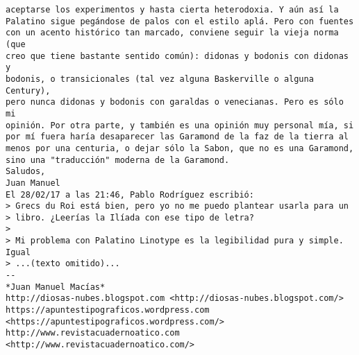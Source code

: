 \documentclass[a4paper,10pt]{article}
\begin{document}
\begin{lstlisting}
aceptarse los experimentos y hasta cierta heterodoxia. Y aún así la 
Palatino sigue pegándose de palos con el estilo aplá. Pero con fuentes 
con un acento histórico tan marcado, conviene seguir la vieja norma (que 
creo que tiene bastante sentido común): didonas y bodonis con didonas y 
bodonis, o transicionales (tal vez alguna Baskerville o alguna Century), 
pero nunca didonas y bodonis con garaldas o venecianas. Pero es sólo mi 
opinión. Por otra parte, y también es una opinión muy personal mía, si 
por mí fuera haría desaparecer las Garamond de la faz de la tierra al 
menos por una centuria, o dejar sólo la Sabon, que no es una Garamond, 
sino una "traducción" moderna de la Garamond.
Saludos,
Juan Manuel
El 28/02/17 a las 21:46, Pablo Rodríguez escribió:
> Grecs du Roi está bien, pero yo no me puedo plantear usarla para un
> libro. ¿Leerías la Ilíada con ese tipo de letra?
>
> Mi problema con Palatino Linotype es la legibilidad pura y simple. Igual
> ...(texto omitido)...
-- 
*Juan Manuel Macías*
http://diosas-nubes.blogspot.com <http://diosas-nubes.blogspot.com/>
https://apuntestipograficos.wordpress.com 
<https://apuntestipograficos.wordpress.com/>
http://www.revistacuadernoatico.com <http://www.revistacuadernoatico.com/>

\end{lstlisting}
\end{document}
